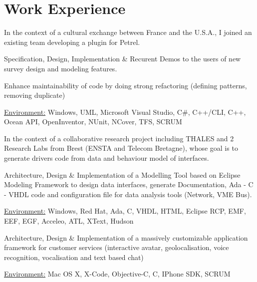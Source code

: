 \documentclass[10pt,letterpaper]{resume/resume}
\begin{document}
  \begin{minipage}[t]{\linewidth}
    \section{Work Experience}

\par In the context of a cultural exchange between France and the U.S.A., I joined an existing team developing a plugin for Petrel.
\par Specification, Design, Implementation \& Recurent Demos to the users of new survey design and modeling features.
\par Enhance maintainability of code by doing strong refactoring (defining patterns, removing duplicate)
\par\underline{Environment:} Windows, UML, Microsoft Visual Studio, C\#, C++/CLI, C++, Ocean API, OpenInventor, NUnit, NCover, TFS, SCRUM


\par In the context of a collaborative research project including THALES and 2 Research Labs from Brest (ENSTA and Telecom Bretagne), whose goal is to generate drivers code from data and behaviour model of interfaces.
\par Architecture, Design \& Implementation of a Modelling Tool based on Eclipse Modeling Framework to design data interfaces, generate Documentation, Ada - C - VHDL code and configuration file for data analysis tools (Network, VME Bus).
\par\underline{Environment:} Windows, Red Hat, Ada, C, VHDL, HTML, Eclipse RCP, EMF, EEF, EGF, Acceleo, ATL, XText, Hudson

\par Architecture, Design \& Implementation of a massively customizable application framework for customer services (interactive avatar, geolocalisation, voice recognition, vocalisation and text based chat) 
\par\underline{Environment:} Mac OS X, X-Code, Objective-C, C, IPhone SDK, SCRUM


\end{minipage}
\end{document}
